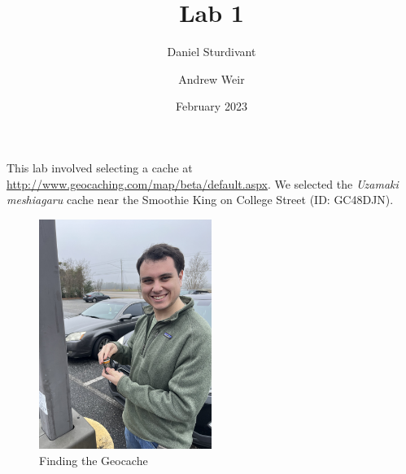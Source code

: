 \documentclass[11pt]{article}
\author{Daniel Sturdivant}
\author{Andrew Weir}
\title{Lab 1}
\date{February 2023}
\begin{document}
\maketitle
\thispagestyle{fancy}
\setlength{\parindent}{0pt}

This lab involved selecting a cache at 
\url{http://www.geocaching.com/map/beta/default.aspx}. We selected the 
\emph{Uzamaki meshiagaru} cache near the Smoothie King on College Street 
(ID: GC48DJN).
\begin{figure}[H]
  \centering
  \includegraphics[angle=270,width=0.5\textwidth]{IMG_5872.jpg}
  \caption{Finding the Geocache}
\end{figure}
\end{document}
